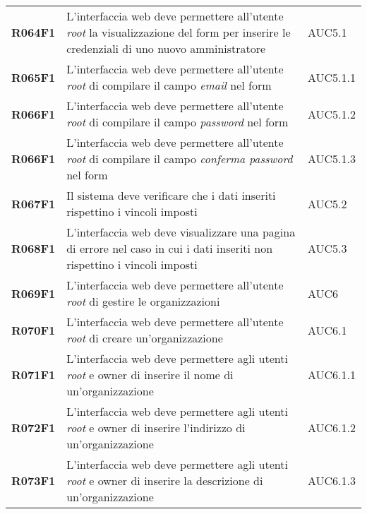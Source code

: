 \documentclass[../analisi-dei-requisiti.tex]{subfiles}
\begin{document}
\begin{longtable}[H]{>{\centering\bfseries}m{3cm} >{\centering}m{10cm} >{\centering\arraybackslash}m{3cm}}
  R064F1                  & L'interfaccia web deve permettere all'utente \textit{root} la visualizzazione del form per inserire le credenziali di uno nuovo amministratore & AUC5.1                        \\
  R065F1                  & L'interfaccia web deve permettere all'utente \textit{root} di compilare il campo \textit{email} nel form                                       & AUC5.1.1                      \\
  R066F1                  & L'interfaccia web deve permettere all'utente \textit{root} di compilare il campo \textit{password} nel form                                    & AUC5.1.2                      \\
  R066F1                  & L'interfaccia web deve permettere all'utente \textit{root} di compilare il campo \textit{conferma password} nel form                           & AUC5.1.3                      \\
  R067F1                  & Il sistema deve verificare che i dati inseriti rispettino i vincoli imposti                                                                    & AUC5.2                        \\
  R068F1                  & L'interfaccia web deve visualizzare una pagina di errore nel caso in cui i dati inseriti non rispettino i vincoli imposti                      & AUC5.3                        \\
  R069F1                  & L'interfaccia web deve permettere all'utente \textit{root} di gestire le organizzazioni                                                        & AUC6                          \\
  R070F1                  & L'interfaccia web deve permettere all'utente \textit{root} di creare un'organizzazione                                                         & AUC6.1                        \\
  R071F1                  & L'interfaccia web deve permettere agli utenti \textit{root} e owner di inserire il nome di un'organizzazione                                   & AUC6.1.1                      \\
  R072F1                  & L'interfaccia web deve permettere agli utenti \textit{root} e owner di inserire l'indirizzo di un'organizzazione                               & AUC6.1.2                      \\
  R073F1                  & L'interfaccia web deve permettere agli utenti \textit{root} e owner di inserire la descrizione di un'organizzazione                            & AUC6.1.3                      \\

\end{longtable}
\end{document}
